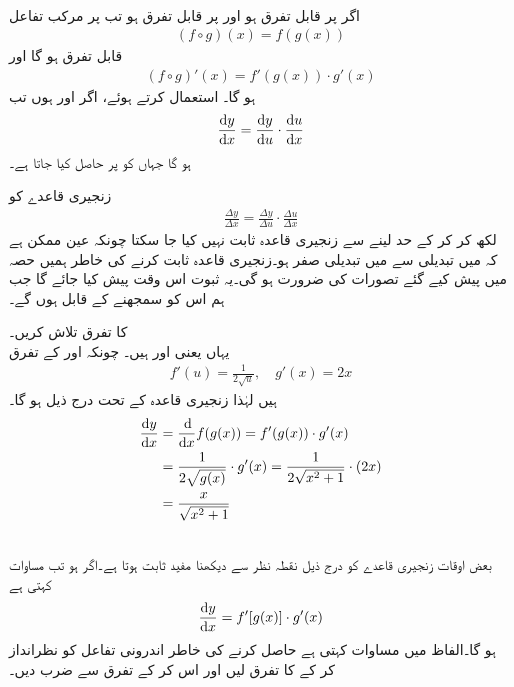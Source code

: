 \\
اگر  پر  قابل تفرق ہو اور  پر  قابل تفرق ہو تب  پر مرکب تفاعل
\begin{align*}
 (f\circ g)(x)=f(g(x))
\end{align*}
قابل تفرق ہو گا اور
\begin{align}\label{مساوات_تفرق_زنجیری_الف}
(f\circ g)'(x)=f'(g(x))\cdot g'(x)
\end{align}
ہو گا۔   استعمال کرتے ہوئے، اگر  اور  ہوں تب 
\begin{align}\label{مساوات_تفرق_زنجیری_ب}
\frac{\dif y}{\dif x}=\frac{\dif y}{\dif u}\cdot \frac{\dif u}{\dif x}
\end{align}
ہو گا جہاں  کو  پر حاصل کیا جاتا ہے۔

زنجیری قاعدے کو
\begin{align*}
\frac{\Delta y}{\Delta x}=\frac{\Delta y}{\Delta u}\cdot \frac{\Delta u}{\Delta x}
\end{align*}
لکھ کر  کر کے  حد لینے سے زنجیری قاعدہ ثابت نہیں کیا جا سکتا  چونکہ عین ممکن ہے کہ  میں تبدیلی سے  میں تبدیلی  صفر ہو۔زنجیری قاعدہ ثابت کرنے کی خاطر ہمیں حصہ  میں پیش کیے گئے تصورات کی ضرورت ہو گی۔یہ ثبوت اس وقت پیش کیا جائے گا جب ہم اس کو سمجھنے کے قابل ہوں گے۔

 کا تفرق تلاش کریں۔\\
یہاں  یعنی  اور  ہیں۔ چونکہ  اور  کے تفرق
\begin{align*}
f'(u)=\frac{1}{2\sqrt{u}},\quad g'(x)=2x
\end{align*}
ہیں لہٰذا زنجیری قاعدہ کے تحت درج ذیل ہو گا۔
\begin{align*}
\frac{\dif y}{\dif x}&=\frac{\dif}{\dif x}f(g(x))=f'(g(x))\cdot g'(x)\\
&=\frac{1}{2\sqrt{g(x)}}\cdot g'(x)=\frac{1}{2\sqrt{x^2+1}}\cdot (2x)\\
&=\frac{x}{\sqrt{x^2+1}}
\end{align*}


\\
بعض اوقات زنجیری قاعدے کو   درج ذیل نقطہ نظر سے دیکھنا مفید ثابت ہوتا ہے۔اگر  ہو تب مساوات   کہتی ہے 
\begin{align}\label{مساوات_تفرق_زنجیری_ب_دوسرا}
\frac{\dif y}{\dif x}=f'[g(x)]\cdot g'(x)
\end{align}
ہو گا۔الفاظ میں  مساوات  کہتی ہے  حاصل کرنے کی خاطر اندرونی تفاعل    کو نظرانداز کر کے   کا تفرق لیں اور اس کر   کے تفرق سے ضرب دیں۔


